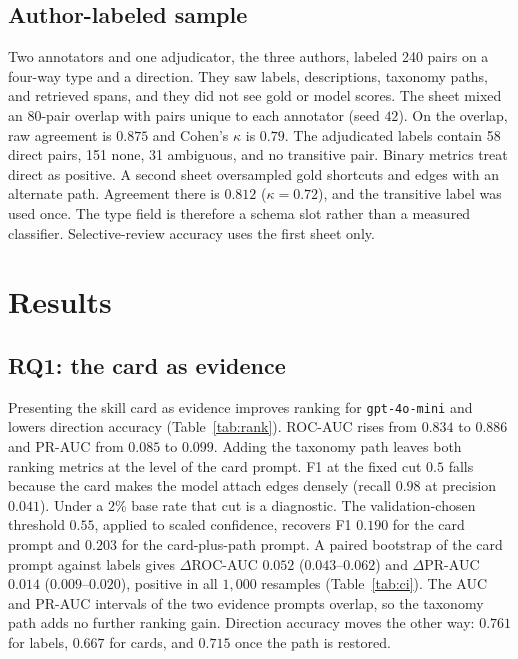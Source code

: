 \documentclass{ws-ijait}
\begin{document}
\subsection{Author-labeled sample}
\label{sec:human}
Two annotators and one adjudicator, the three authors, labeled 240
pairs on a four-way type and a direction.
They saw labels, descriptions, taxonomy paths, and retrieved spans,
and they did not see gold or model scores.
The sheet mixed an 80-pair overlap with pairs unique to each
annotator (seed $42$).
On the overlap, raw agreement is $0.875$ and Cohen's $\kappa$ is
$0.79$.
The adjudicated labels contain 58 direct pairs, 151 none, 31
ambiguous, and no transitive pair.
Binary metrics treat direct as positive.
A second sheet oversampled gold shortcuts and edges with an
alternate path.
Agreement there is $0.812$ ($\kappa=0.72$), and the transitive
label was used once.
The type field is therefore a schema slot rather than a measured
classifier.
Selective-review accuracy uses the first sheet only.

\section{Results}
\label{sec:results}

\subsection{RQ1: the card as evidence}
\label{sec:rq1}
Presenting the skill card as evidence improves ranking for
\texttt{gpt-4o-mini} and lowers direction accuracy
(Table~\ref{tab:rank}).
{ROC}-{AUC} rises from $0.834$ to $0.886$ and {PR}-{AUC} from
$0.085$ to $0.099$.
Adding the taxonomy path leaves both ranking metrics at the level
of the card prompt.
{F1} at the fixed cut $0.5$ falls because the card makes the model
attach edges densely (recall $0.98$ at precision $0.041$).
Under a $2$\% base rate that cut is a diagnostic.
The validation-chosen threshold $0.55$, applied to scaled
confidence, recovers {F1} $0.190$ for the card prompt and $0.203$
for the card-plus-path prompt.
A paired bootstrap of the card prompt against labels gives
$\Delta${ROC}-{AUC} $0.052$ ($0.043$--$0.062$) and
$\Delta${PR}-{AUC} $0.014$ ($0.009$--$0.020$), positive in all
$1{,}000$ resamples (Table~\ref{tab:ci}).
The {AUC} and {PR}-{AUC} intervals of the two evidence prompts
overlap, so the taxonomy path adds no further ranking gain.
Direction accuracy moves the other way: $0.761$ for labels, $0.667$
for cards, and $0.715$ once the path is restored.
\end{document}
